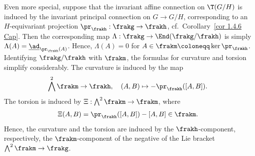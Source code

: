 Even more special, suppose that the invariant affine connection on $\T(G\slash H)$ is induced by the invariant principal connection on $G\to G\slash H$, corresponding to an $H$-equivariant projection $\pr_\frakh:\frakg\to\frakh$, cf.\ Corollary~\ref{cor 1.4.6 Cap}. Then the corresponding map $\Lambda:\frakg\to \End(\frakg\slash\frakh)$ is simply $\Lambda(A)=\underline{\ad}_{\pr_\frakh(A)}$. Hence, $\Lambda(A)=0$ for $A\in \frakm\coloneqq \ker\pr_\frakh$. Identifying $\frakg\slash\frakh$ with $\frakm$, the formulas for curvature and torsion simplify considerably. The curvature is induced by the map 
\[\bigwedge^2\frakm\to \frakh,\quad (A,B)\mapsto -\pr_\frakh([A,B]).\]
The torsion is induced by $\Xi:\bigwedge^2\frakm\to \frakm$, where 
\[\Xi(A,B)=\pr_\frakh([A,B])-[A,B]\in\frakm.\]
Hence, the curvature and the torsion are induced by the $\frakh$-component, respectively, the $\frakm$-component of the negative of the Lie bracket $\bigwedge^2\frakm\to \frakg$.

